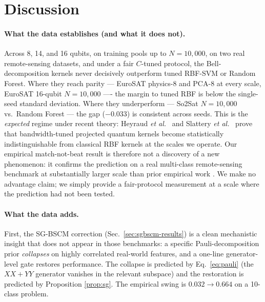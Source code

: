 \documentclass[pdflatex,sn-mathphys-num]{sn-jnl}
\theoremstyle{thmstyleone}
\theoremstyle{thmstyletwo}
\theoremstyle{thmstylethree}
\begin{document}
\section{Discussion}\label{sec:disc}

\paragraph{What the data establishes (and what it does not).}
Across 8, 14, and 16 qubits, on training pools up to $N=10{,}000$,
on two real remote-sensing datasets, and under a fair $C$-tuned protocol,
the Bell-decomposition kernels never decisively outperform tuned RBF-SVM
or Random Forest. Where they reach parity --- EuroSAT physics-8 and
PCA-8 at every scale, EuroSAT 16-qubit $N=10{,}000$ ---- the margin
to tuned RBF is below the single-seed standard deviation. Where they
underperform --- So2Sat $N=10{,}000$ vs.\ Random Forest --- the gap
($-0.033$) is consistent across seeds. This is the
\emph{expected} regime under recent theory:
Heyraud \emph{et al.}\ \cite{heyraud2022} and
Slattery \emph{et al.}\ \cite{slattery2025} prove that bandwidth-tuned
projected quantum kernels become statistically indistinguishable from
classical RBF kernels at the scales we operate. Our empirical
match-not-beat result is therefore not a discovery of a new
phenomenon: it confirms the prediction on a real multi-class
remote-sensing benchmark at substantially larger scale than prior
empirical work \cite{bowles2024,schnabel2025,rodriguez2025}. We make
no advantage claim; we simply provide a fair-protocol measurement at
a scale where the prediction had not been tested.

\paragraph{What the data adds.}
First, the SG-BSCM correction (Sec.~\ref{sec:sgbscm-results}) is a
clean mechanistic insight that does not appear in those benchmarks: a
specific Pauli-decomposition prior \emph{collapses} on highly correlated
real-world features, and a one-line generator-level gate restores
performance. The collapse is predicted by Eq.~\ref{eq:pauli} (the
$XX\!+\!YY$ generator vanishes in the relevant subspace) and the
restoration is predicted by Proposition \ref{prop:sg}. The empirical
swing is $0.032\to 0.664$ on a 10-class problem.
\end{document}
